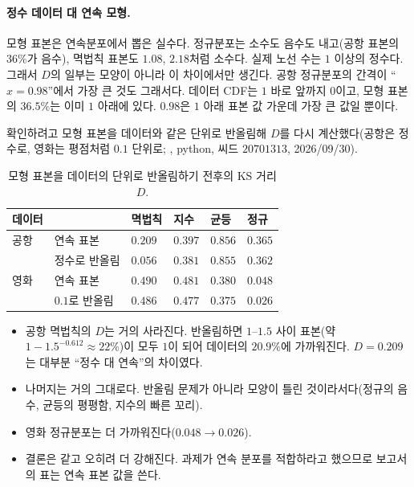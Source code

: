 \documentclass[11pt]{article}
\begin{document}
\paragraph{정수 데이터 대 연속 모형.} 모형 표본은 연속분포에서 뽑은 실수다. 정규분포는 소수도
음수도 내고(공항 표본의 $36\%$가 음수), 멱법칙 표본도 $1.08$, $2.18$처럼 소수다. 실제 노선
수는 $1$ 이상의 정수다. 그래서 $D$의 일부는 모양이 아니라 이 차이에서만 생긴다. 공항
정규분포의 간격이 ``$x = 0.98$''에서 가장 큰 것도 그래서다. 데이터 CDF는 $1$ 바로 앞까지
$0$이고, 모형 표본의 $36.5\%$는 이미 $1$ 아래에 있다. $0.98$은 $1$ 아래 표본 값 가운데
가장 큰 값일 뿐이다.

확인하려고 모형 표본을 데이터와 같은 단위로 반올림해 $D$를 다시 계산했다(공항은 정수로,
영화는 평점처럼 $0.1$ 단위로; , python, 씨드 $20701313$, 2026/09/30).
\begin{table}[H]
  \centering
  \caption{모형 표본을 데이터의 단위로 반올림하기 전후의 KS 거리 $D$.}
  \label{tab:ks-rounded}
  \begin{tabular}{llllll}
    \toprule
    데이터 & & 멱법칙 & 지수 & 균등 & 정규 \\
    \midrule
    공항 & 연속 표본 & $0.209$ & $0.397$ & $0.856$ & $0.365$ \\
         & 정수로 반올림 & $\mathbf{0.056}$ & $0.381$ & $0.855$ & $0.362$ \\
    \midrule
    영화 & 연속 표본 & $0.490$ & $0.481$ & $0.380$ & $0.048$ \\
         & $0.1$로 반올림 & $0.486$ & $0.477$ & $0.375$ & $\mathbf{0.026}$ \\
    \bottomrule
  \end{tabular}
\end{table}
\begin{itemize}
  \item 공항 멱법칙의 $D$는 거의 사라진다. 반올림하면 $1$--$1.5$ 사이 표본(약
        $1 - 1.5^{-0.612} \approx 22\%$)이 모두 $1$이 되어 데이터의 $20.9\%$에 가까워진다.
        $D = 0.209$는 대부분 ``정수 대 연속''의 차이였다.
  \item 나머지는 거의 그대로다. 반올림 문제가 아니라 모양이 틀린 것이라서다(정규의 음수,
        균등의 평평함, 지수의 빠른 꼬리).
  \item 영화 정규분포는 더 가까워진다($0.048 \to 0.026$).
  \item 결론은 같고 오히려 더 강해진다. 과제가 연속 분포를 적합하라고 했으므로 보고서의
        표는 연속 표본 값을 쓴다.
\end{itemize}
\end{document}
